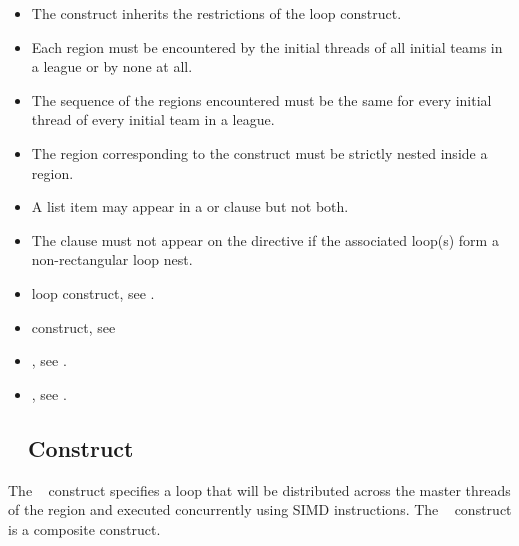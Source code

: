 \begin{itemize}
\item The  construct inherits the restrictions of the loop construct.

\item Each  region must be encountered by the initial
threads of all initial teams in a league or by none at all.

\item The sequence of the  regions encountered must
be the same for every initial thread of every initial team in a league.

\item The region corresponding to the  construct must be
strictly nested inside a  region.

\item A list item may appear in a  or  clause but not both.

\item The  clause must not appear on the 
    directive if the associated loop(s) form a non-rectangular loop nest.
\end{itemize}

\crossreferences
\begin{itemize}
\item loop construct, see
.

\item {} construct, see

\item {}, see .
\item {}, see
.
\end{itemize}










\subsection{~ Construct}
\label{subsec:distribute simd Construct}
\summary
The ~ construct specifies a loop that will be distributed across the
master threads of the  region and executed concurrently using SIMD instructions. The ~ construct is a composite construct.


